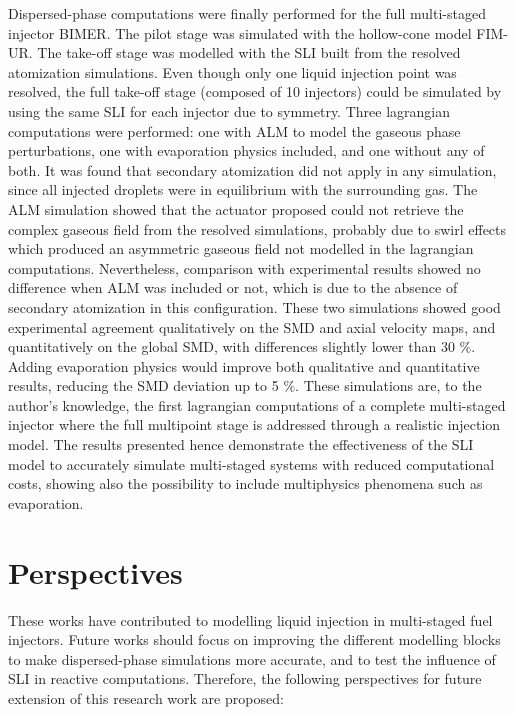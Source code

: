 Dispersed-phase computations were finally performed for the full multi-staged injector BIMER. The pilot stage was simulated with the hollow-cone model FIM-UR. The take-off stage was modelled with the SLI built from the resolved atomization simulations. Even though only one liquid injection point was resolved, the full take-off stage (composed of 10 injectors) could be simulated by using the same SLI for each injector due to symmetry. Three lagrangian computations were performed: one with ALM to model the gaseous phase perturbations, one with evaporation physics included, and one without any of both. It was found that secondary atomization did not apply in any simulation, since all injected droplets were in equilibrium with the surrounding gas. The ALM simulation showed that the actuator proposed could not retrieve the complex gaseous field from the resolved simulations, probably due to swirl effects which produced an asymmetric gaseous field not modelled in the lagrangian computations. Nevertheless, comparison with experimental results showed no difference when ALM was included or not, which is due to the absence of secondary atomization in this configuration. These two simulations showed good experimental agreement qualitatively on the SMD and axial velocity maps, and quantitatively on the global SMD, with differences slightly lower than 30 $\%$. Adding evaporation physics would improve both qualitative and quantitative results, reducing the SMD deviation up to 5 $\%$. These simulations are, to the author's knowledge, the first lagrangian computations of a complete multi-staged injector where the full multipoint stage is addressed through a realistic 
injection model. The results presented hence demonstrate the effectiveness of the SLI model to accurately simulate multi-staged systems with reduced computational costs, showing also the possibility to include multiphysics phenomena such as evaporation.

\clearpage




\section*{Perspectives}

These works have contributed to modelling liquid injection in multi-staged fuel injectors. Future works should focus on improving the different modelling blocks to make dispersed-phase simulations more accurate, and to test the influence of SLI in reactive computations. Therefore, the following perspectives for future extension of this research work are proposed:


